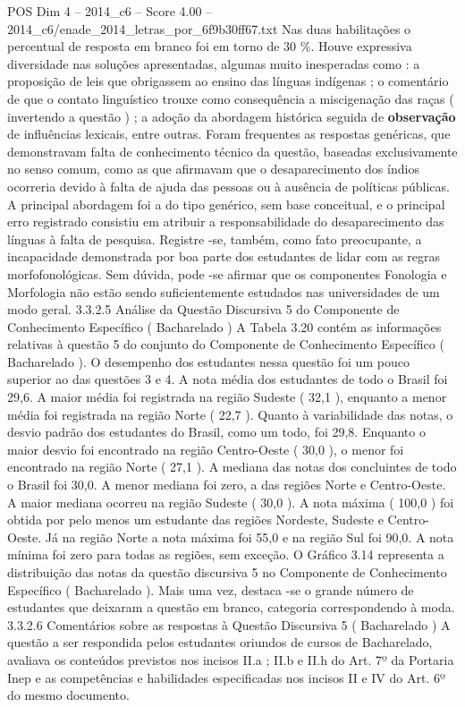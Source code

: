 \begin{textsample}{POS Dim 4 – 2014\_c6 – Score 4.00 – 2014\_c6/enade\_2014\_letras\_por\_6f9b30ff67.txt}
Nas duas habilitações o percentual de resposta em branco foi em torno de 30 \%.
Houve expressiva diversidade nas soluções apresentadas, algumas muito inesperadas como : a proposição de leis que obrigassem ao ensino das línguas indígenas ; o comentário de que o contato linguístico trouxe como consequência a miscigenação das raças ( invertendo a questão ) ; a adoção da abordagem histórica seguida de \textbf{observação} de influências lexicais, entre outras.
Foram frequentes as respostas genéricas, que demonstravam falta de conhecimento técnico da questão, baseadas exclusivamente no senso comum, como as que afirmavam que o desaparecimento dos índios ocorreria devido à falta de ajuda das pessoas ou à ausência de políticas públicas.
A principal abordagem foi a do tipo genérico, sem base conceitual, e o principal erro registrado consistiu em atribuir a responsabilidade do desaparecimento das línguas à falta de pesquisa.
Registre -se, também, como fato preocupante, a incapacidade demonstrada por boa parte dos estudantes de lidar com as regras morfofonológicas.
Sem dúvida, pode -se afirmar que os componentes Fonologia e Morfologia não estão sendo suficientemente estudados nas universidades de um modo geral. 3.3.2.5 Análise da Questão Discursiva 5 do Componente de Conhecimento Específico ( Bacharelado ) A Tabela 3.20 contém as informações relativas à questão 5 do conjunto do Componente de Conhecimento Específico ( Bacharelado ).
O desempenho dos estudantes nessa questão foi um pouco superior ao das questões 3 e 4.
A nota média dos estudantes de todo o Brasil foi 29,6.
A maior média foi registrada na região Sudeste ( 32,1 ), enquanto a menor média foi registrada na região Norte ( 22,7 ).
Quanto à variabilidade das notas, o desvio padrão dos estudantes do Brasil, como um todo, foi 29,8.
Enquanto o maior desvio foi encontrado na região Centro-Oeste ( 30,0 ), o menor foi encontrado na região Norte ( 27,1 ).
A mediana das notas dos concluintes de todo o Brasil foi 30,0.
A menor mediana foi zero, a das regiões Norte e Centro-Oeste.
A maior mediana ocorreu na região Sudeste ( 30,0 ).
A nota máxima ( 100,0 ) foi obtida por pelo menos um estudante das regiões Nordeste, Sudeste e Centro-Oeste.
Já na região Norte a nota máxima foi 55,0 e na região Sul foi 90,0.
A nota mínima foi zero para todas as regiões, sem exceção.
O Gráfico 3.14 representa a distribuição das notas da questão discursiva 5 no Componente de Conhecimento Específico ( Bacharelado ).
Mais uma vez, destaca -se o grande número de estudantes que deixaram a questão em branco, categoria correspondendo à moda. 3.3.2.6 Comentários sobre as respostas à Questão Discursiva 5 ( Bacharelado ) A questão a ser respondida pelos estudantes oriundos de cursos de Bacharelado, avaliava os conteúdos previstos nos incisos II.a ; II.b e II.h do Art. 7º da Portaria Inep e as competências e habilidades especificadas nos incisos II e IV do Art. 6º do mesmo documento.

\end{textsample}
